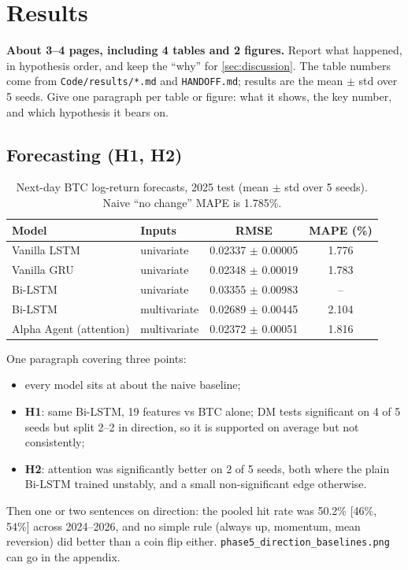 \section{Results}\label{sec:results}

\begin{guide}
\textbf{About 3--4 pages, including 4 tables and 2 figures.} Report what happened, in hypothesis order, and keep the ``why'' for \cref{sec:discussion}. The table numbers come from \texttt{Code/results/*.md} and \texttt{HANDOFF.md}; results are the mean $\pm$ std over 5 seeds. Give one paragraph per table or figure: what it shows, the key number, and which hypothesis it bears on.
\end{guide}

\subsection{Forecasting (H1, H2)}\label{sec:res-forecast}

\begin{table}[ht]
  \centering
  \caption{Next-day BTC log-return forecasts, 2025 test (mean $\pm$ std over 5 seeds). Naive ``no change'' MAPE is 1.785\%.}
  \label{tab:forecast}
  \small
  \begin{tabular}{llcc}
    \toprule
    Model & Inputs & RMSE & MAPE (\%) \\
    \midrule
    Vanilla LSTM            & univariate   & 0.02337 $\pm$ 0.00005 & 1.776 \\
    Vanilla GRU             & univariate   & 0.02348 $\pm$ 0.00019 & 1.783 \\
    Bi-LSTM                 & univariate   & 0.03355 $\pm$ 0.00983 & -- \\
    Bi-LSTM                 & multivariate & 0.02689 $\pm$ 0.00445 & 2.104 \\
    Alpha Agent (attention) & multivariate & 0.02372 $\pm$ 0.00051 & 1.816 \\
    \bottomrule
  \end{tabular}
\end{table}

\begin{guide}
One paragraph covering three points:
\begin{itemize}
  \item every model sits at about the naive baseline;
  \item \textbf{H1}: same Bi-LSTM, 19 features vs BTC alone; DM tests significant on 4 of 5 seeds but split 2--2 in direction, so it is supported on average but not consistently;
  \item \textbf{H2}: attention was significantly better on 2 of 5 seeds, both where the plain Bi-LSTM trained unstably, and a small non-significant edge otherwise.
\end{itemize}
Then one or two sentences on direction: the pooled hit rate was 50.2\% [46\%, 54\%] across 2024--2026, and no simple rule (always up, momentum, mean reversion) did better than a coin flip either. \texttt{phase5\_direction\_baselines.png} can go in the appendix.
\end{guide}
\tbc{}

